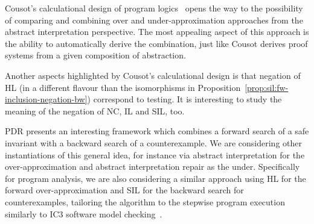 Cousot's calculational design of program logics~\cite{Cousot24} opens the way to the possibility of comparing and combining over and under-approximation approaches from the abstract interpretation perspective. The most appealing aspect of this approach is the ability to automatically derive the combination, just like Cousot derives proof systems from a given composition of abstraction.

Another aspects highlighted by Cousot's calculational design is that negation of HL (in a different flavour than the isomorphisms in Proposition~\ref{prop:sil:fw-inclusion-negation-bw}) correspond to testing. It is interesting to study the meaning of the negation of NC, IL and SIL, too.

PDR presents an interesting framework which combines a forward search of a safe invariant with a backward search of a counterexample. We are considering other instantiations of this general idea, for instance via abstract interpretation for the over-approximation and abstract interpretation repair as the under. Specifically for program analysis, we are also considering a similar approach using HL for the forward over-approximation and SIL for the backward search for counterexamples, tailoring the algorithm to the stepwise program execution similarly to IC3 software model checking~\cite{LNNK20}.
